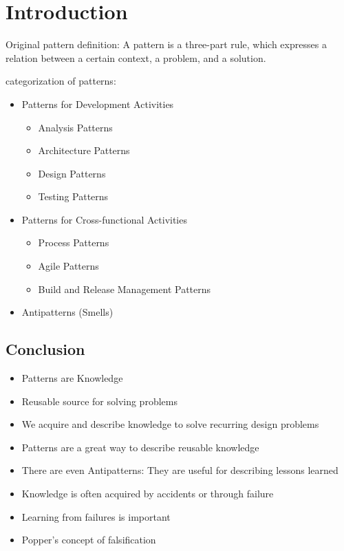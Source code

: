 
\section{Introduction}

Original pattern definition: A pattern is a three-part rule, which expresses a relation between a certain context, a problem, and a solution.

categorization of patterns:
\begin{itemize}
	\item Patterns for Development Activities
		\begin{itemize}
			\item Analysis Patterns
			\item Architecture Patterns
			\item Design Patterns
			\item Testing Patterns
		\end{itemize}
	\item Patterns for Cross-functional Activities
		\begin{itemize}
			\item Process Patterns
			\item Agile Patterns
			\item Build and Release Management Patterns
		\end{itemize}
	\item Antipatterns (Smells)
\end{itemize}

\subsection{Conclusion}

\begin{itemize}
	\item  Patterns are Knowledge
	\item  Reusable source for solving problems
	\item  We acquire and describe knowledge to solve
	recurring design problems
	\item  Patterns are a great way to describe reusable
	knowledge
	\item  There are even Antipatterns: They are useful for
	describing lessons learned
	\item  Knowledge is often acquired by accidents or
	through failure
	\item  Learning from failures is important
	\item  Popper’s concept of falsification
\end{itemize}
\newpage
